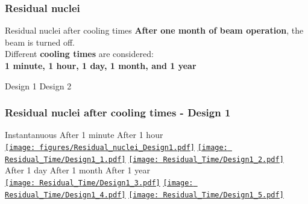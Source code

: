 \documentclass[xcolor={dvipsnames}]{beamer}
\begin{document}

\subsubsection{Residual nuclei}
\begin{frame}{Residual nuclei after cooling times}
\textbf{After one month of beam operation}, the beam is turned off.\\
Different \textbf{cooling times} are considered:\\
\textbf{1 minute, 1 hour, 1 day, 1 month, and 1 year}
  \begin{center}
  \hspace*{1.6cm} Design 1 \hfill Design 2 \hspace*{1.8cm} \\
  \end{center}
\end{frame}
\begin{frame}
  \frametitle{Residual nuclei after cooling times - Design 1}
  \hypertarget{residualtimesprev_Design1}{}
  \centering
    \hspace*{1.6cm} Instantanuous \hfill After 1 minute \hfill After 1 hour \hspace*{1.8cm} \\
  \hyperlink{Residual_nuclei_Design1}{\texttt{[image: figures/Residual\_nuclei\_Design1.pdf]}}
  \hyperlink{Residual_nuclei_minute_Design1}{\texttt{[image: Residual\_Time/Design1\_1.pdf]}}
  \hyperlink{Residual_nuclei_hour_Design1}{\texttt{[image: Residual\_Time/Design1\_2.pdf]}}\\
    \hspace*{1.6cm} After 1 day \hfill After 1 month \hfill After 1 year\hspace*{1.8cm} \\
  \hyperlink{Residual_nuclei_day_Design1}{\texttt{[image: Residual\_Time/Design1\_3.pdf]}}
  \hyperlink{Residual_nuclei_month_Design1}{\texttt{[image: Residual\_Time/Design1\_4.pdf]}}
  \hyperlink{Residual_nuclei_year_Design1}{\texttt{[image: Residual\_Time/Design1\_5.pdf]}}
\end{frame}
\end{document}
